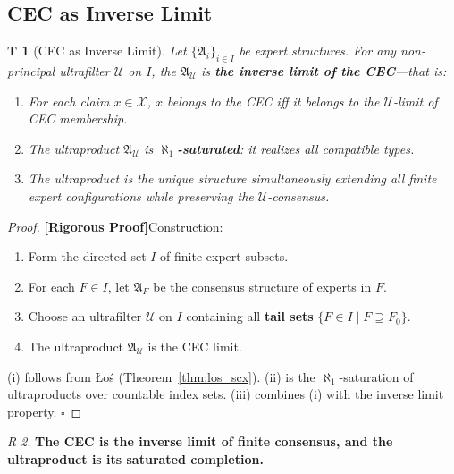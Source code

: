 \documentclass[12pt,a4paper]{article}
\newtheorem{theorem}Theorem[section]
\theoremstyle{remark}
\newtheorem{remark}[theorem]Remark
\newcommand{\ClaimSpace}{\mathcal{X}}
\newcommand{\Ultrafilter}{\mathcal{U}}
\newcommand{\Struct}{\mathfrak{A}}
\newcommand{\rigorous}{\textnormal{\textbf{[Rigorous Proof]}}}
\begin{document}
\subsection{CEC as Inverse Limit}
\begin{theorem}[CEC as Inverse Limit]\label{thm:cec_limit}
Let \(\{\Struct_i\}_{i \in I}\) be expert structures. For any non-principal ultrafilter \(\Ultrafilter\) on \(I\), the \(\Struct_{\Ultrafilter}\) is \textbf{the inverse limit of the CEC}---that is:
\begin{enumerate}[label=(\roman*),itemsep=3pt]
    \item For each claim \(x \in \ClaimSpace\), \(x\) belongs to the CEC iff it belongs to the \(\Ultrafilter\)-limit of CEC membership.
    \item The ultraproduct \(\Struct_{\Ultrafilter}\) is \textbf{\(\aleph_1\)-saturated}: it realizes all compatible types.
    \item The ultraproduct is the unique structure simultaneously extending all finite expert configurations while preserving the \(\Ultrafilter\)-consensus.
\end{enumerate}
\end{theorem}
\begin{proof}
\rigorous Construction:
\begin{enumerate}[label=(\arabic*),itemsep=3pt]
    \item Form the directed set \(I\) of finite expert subsets.
    \item For each \(F \in I\), let \(\Struct_F\) be the consensus structure of experts in \(F\).
    \item Choose an ultrafilter \(\Ultrafilter\) on \(I\) containing all \textbf{tail sets} \(\{F \in I \mid F \supseteq F_0\}\).
    \item The ultraproduct \(\Struct_{\Ultrafilter}\) is the CEC limit.
\end{enumerate}

(i) follows from Łoś (Theorem~\ref{thm:los_scx}). (ii) is the \(\aleph_1\)-saturation of ultraproducts over countable index sets. (iii) combines (i) with the inverse limit property. \(\square\)
\end{proof}
\begin{remark}
\textbf{The CEC is the inverse limit of finite consensus, and the ultraproduct is its saturated completion.}
\end{remark}
\end{document}
